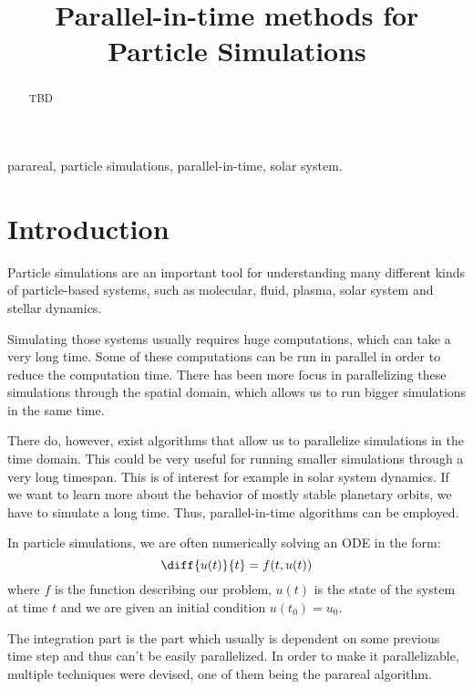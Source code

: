 \documentclass[conference]{IEEEtran}
\begin{document}
\title{Parallel-in-time methods for Particle Simulations}

\author{
}

\maketitle

\begin{abstract}
TBD
\end{abstract}

\begin{IEEEkeywords}
parareal, particle simulations, parallel-in-time, solar system.
\end{IEEEkeywords}

\section{Introduction}

Particle simulations are an important tool for understanding many different kinds of particle-based systems, such as molecular, fluid, plasma, solar system and stellar dynamics.

Simulating those systems usually requires huge computations, which can take a very long time. Some of these computations can be run in parallel in order to reduce the computation time. There has been more focus in parallelizing these simulations through the spatial domain, which allows us to run bigger simulations in the same time.

There do, however, exist algorithms that allow us to parallelize simulations in the time domain. This could be very useful for running smaller simulations through a very long timespan. This is of interest for example in solar system dynamics. If we want to learn more about the behavior of mostly stable planetary orbits, we have to simulate a long time. Thus, parallel-in-time algorithms can be employed.\cite{parallelsolar}

In particle simulations, we are often numerically solving an ODE in the form:
$$
\diff{u(t)}{t} = f(t, u(t))
$$
where $f$ is the function describing our problem, $u(t)$ is the state of the system at time $t$ and we are given an initial condition $u(t_0) = u_0$.

The integration part is the part which usually is dependent on some previous time step and thus can't be easily parallelized. In order to make it parallelizable, multiple techniques were devised, one of them being the parareal algorithm.
\end{document}
